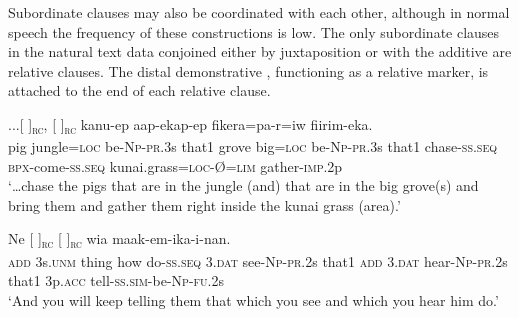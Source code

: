 Subordinate clauses may also be coordinated with each other, although in normal speech the frequency of these constructions is low. The only subordinate clauses in the natural text data conjoined either by juxtaposition or with the additive  are relative clauses. The distal demonstrative , functioning as a relative marker, is attached to the end of each relative clause.

\ea%
\label{ex:x1381}
\gll ...[      ]\textsubscript{\textsc{rc}}, [  
  ]\textsubscript{\textsc{rc}}  kanu-ep  aap-ekap-ep fikera=pa-r=iw  fiirim-eka.\\
pig  jungle=\textsc{loc} be-\textsc{Np}-\textsc{pr}.3s that1 grove  big=\textsc{loc} be-\textsc{Np}-\textsc{pr}.3s that1 chase-\textsc{ss}.\textsc{seq} \textsc{\textsc{bp}x}-come-\textsc{ss}.\textsc{seq} kunai.grass=\textsc{loc}-{\O}=\textsc{lim} gather-\textsc{imp}.2p\\
\glt`{\dots}chase the pigs that are in the jungle (and) that are in the big grove(s) and bring them and gather them right inside the kunai grass (area).'
\z


\ea%
\label{ex:x1382}
\gll Ne [       ]\textsubscript{\textsc{rc}}   [  ]\textsubscript{\textsc{rc}} wia  maak-em-ika-i-nan.\\
\textsc{add} 3s.\textsc{unm} thing  how  do-\textsc{ss}.\textsc{seq} 3.\textsc{dat} see-\textsc{Np}-\textsc{pr}.2s that1 \textsc{add} 3.\textsc{dat} hear-\textsc{Np}-\textsc{pr}.2s that1 3p.\textsc{acc} tell-\textsc{ss}.\textsc{sim}-be-\textsc{Np}-\textsc{fu}.2s\\
\glt`And you will keep telling them that which you see and which you hear him do.'
\z



